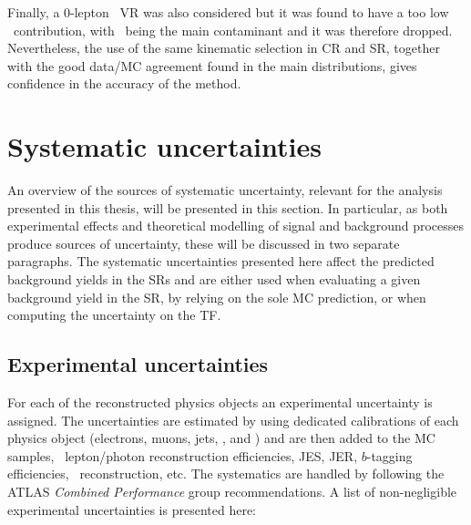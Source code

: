 		Finally, a $0$-lepton \ttgamma\ \ac{VR} was also considered but it was found to have a too low \ttgamma\ contribution, with \gammajets\ being the main contaminant and it was therefore dropped. Nevertheless, the use of the same kinematic selection in \ac{CR}  and \ac{SR}, together with the good data/\ac{MC} agreement found in the main distributions, gives confidence in the accuracy of the method.



	\section{Systematic uncertainties}
	\label{sec:syst_unc}

		An overview of the sources of systematic uncertainty, relevant for the analysis presented in this thesis, will be presented in this section. In particular, as both experimental effects and theoretical modelling of signal and background processes produce sources of uncertainty, these will be discussed in two separate paragraphs. The systematic uncertainties presented here affect the predicted background yields in the \acp{SR} and are either used when evaluating a given background yield in the \ac{SR}, by relying on the sole \ac{MC} prediction, or when computing the uncertainty on the \ac{TF}.%


		\subsection{Experimental uncertainties}
			
			For each of the reconstructed physics objects an experimental uncertainty is assigned. The uncertainties are estimated by using dedicated calibrations of each physics object (electrons, muons, jets, \bjs, and \met) and are then added to the \ac{MC} samples, \eg\ lepton/photon reconstruction efficiencies, \ac{JES}, \ac{JER}, $b$-tagging efficiencies, \met\ reconstruction, etc. The systematics are handled by following the ATLAS \emph{Combined Performance} group recommendations. A list of non-negligible experimental uncertainties is presented here:

